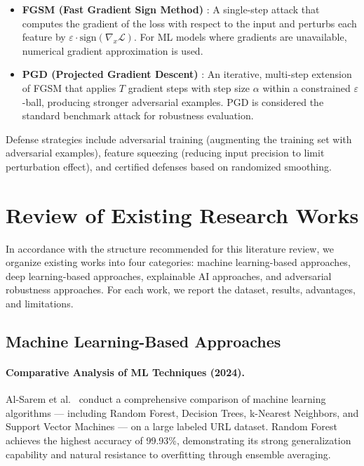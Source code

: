 \begin{itemize}
    \item \textbf{FGSM (Fast Gradient Sign Method)} \cite{goodfellow2014}: A single-step attack that computes the gradient of the loss with respect to the input and perturbs each feature by $\varepsilon \cdot \text{sign}(\nabla_x \mathcal{L})$. For ML models where gradients are unavailable, numerical gradient approximation is used.
    \item \textbf{PGD (Projected Gradient Descent)} \cite{madry2018}: An iterative, multi-step extension of FGSM that applies $T$ gradient steps with step size $\alpha$ within a constrained $\varepsilon$-ball, producing stronger adversarial examples. PGD is considered the standard benchmark attack for robustness evaluation.
\end{itemize}

Defense strategies include adversarial training (augmenting the training set with adversarial examples), feature squeezing (reducing input precision to limit perturbation effect), and certified defenses based on randomized smoothing.

\section{Review of Existing Research Works}

In accordance with the structure recommended for this literature review, we organize existing works into four categories: machine learning-based approaches, deep learning-based approaches, explainable AI approaches, and adversarial robustness approaches. For each work, we report the dataset, results, advantages, and limitations.

\subsection{Machine Learning-Based Approaches}

\paragraph{Comparative Analysis of ML Techniques (2024).}
Al-Sarem et al.~\cite{ref_etasr} conduct a comprehensive comparison of machine learning algorithms — including Random Forest, Decision Trees, k-Nearest Neighbors, and Support Vector Machines — on a large labeled URL dataset. Random Forest achieves the highest accuracy of 99.93\%, demonstrating its strong generalization capability and natural resistance to overfitting through ensemble averaging.

